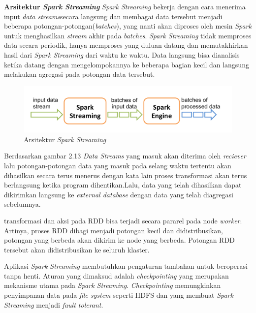 \documentclass[a4paper,twoside]{article}
\begin{document}
\begin{enumerate}
		\textbf{Arsitektur \textit{Spark Streaming}}
		\textit{Spark Streaming} bekerja dengan cara menerima input \textit{data streams}secara 				langsung dan membagai data tersebut menjadi beberapa potongan-potongan(\textit{batches}), 				yang nanti akan diproses oleh mesin \textit{Spark} untuk menghasilkan \textit{stream} akhir 			pada \textit{batches}. \textit{Spark Streaming} tidak memproses data secara periodik, hanya 			memproses yang duluan datang dan memutakhirkan hasil dari \textit{Spark Streaming} dari 				waktu ke waktu. Data langsung bisa dianalisis ketika datang dengan mengelompokannya ke 					beberapa bagian kecil dan langsung melakukan agregasi pada potongan data tersebut.
		
		\begin{figure}[H] 
		\centering  
		\includegraphics[scale=0.7]{streaming-flow}  
		\caption[Gambar Arsitektur {\it Spark Streaming}]{Arsitektur {\it Spark Streaming}} 
		\label{fig:processing-events relationship} 
		\end{figure}
	
	
		Berdasarkan gambar 2.13 \textit{Data Streams} yang masuk akan diterima oleh 							\textit{reciever} lalu potongan-potongan data yang masuk pada selang waktu tertentu akan 				dihasilkan secara terus menerus dengan kata lain proses transformasi akan terus berlangsung 			ketika program dihentikan.Lalu, data yang telah dihasilkan dapat dikirimkan langsung ke 				\textit{external database} dengan data yang telah diagregasi sebelumnya.

		transformasi dan aksi pada RDD bisa terjadi secara pararel pada node \textit{worker}. 					Artinya, proses RDD dibagi menjadi potongan kecil dan didistribusikan, potongan yang berbeda 		akan dikirim ke node yang berbeda. Potongan RDD tersebut akan didistribusikan ke seluruh 				klaster.

		Aplikasi \textit{Spark Streaming} membutuhkan pengaturan tambahan untuk beroperasi tanpa 				henti. Aturan yang dimaksud adalah \textit{checkpointing} yang merupakan mekanisme utama 				pada \textit{Spark Streaming}. \textit{Checkpointing} memungkinkan penyimpanan data pada 				\textit{file system} seperti HDFS dan yang membuat \textit{Spark Streaming} menjadi 					\textit{fault tolerant}.
		

\end{enumerate}
\end{document}
